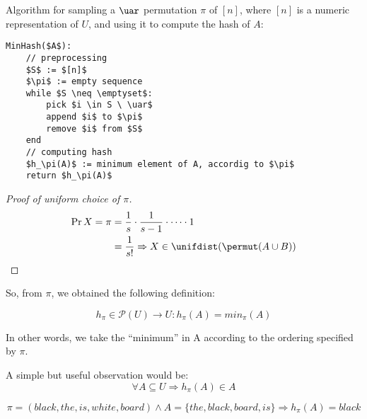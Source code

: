 Algorithm for sampling a $\uar$ permutation $\pi$ of $[n]$, where $[n]$ is a numeric representation of $U$, and using it to compute the hash of $A$:
\begin{lstlisting}[caption={min hash or shingles algorithm},label={lst:min_hash}]
	MinHash($A$):
	// preprocessing
	$S$ := $[n]$
	$\pi$ := empty sequence
	while $S \neq \emptyset$:
		pick $i \in S \ \uar$
		append $i$ to $\pi$
		remove $i$ from $S$
	end
	// computing hash
	$h_\pi(A)$ := minimum element of A, accordig to $\pi$
	return $h_\pi(A)$
\end{lstlisting}

\begin{proof}[Proof of uniform choice of $\pi$]
	\begin{align*}
	\Pr{X = \pi} &= \frac{1}{s}\cdot\frac{1}{s-1}\cdot\dots\cdot 1\\
	&= \frac{1}{s!} \Rightarrow X \in \unifdist(\permut(A \cup B))
	\end{align*}
\end{proof}

So, from $\pi$, we obtained the following definition:
\begin{defn}
	\begin{equation}
	h_\pi \in \mathcal{P}(U) \to U : h_\pi(A) = min_\pi(A)
	\end{equation}
\end{defn}

In other words, we take the ``minimum'' in A according to the ordering specified by $\pi$.

\begin{obs}
	A simple but useful observation would be:
	\begin{equation}
	\forall A \subseteq U \Rightarrow h_\pi(A) \in A
	\end{equation}
\end{obs}

\begin{ex}
	\begin{equation*}
		\pi = (black, the, is, white, board) \wedge A = \{the, black, board, is\} \Rightarrow h_\pi(A) = black
	\end{equation*}
\end{ex}

